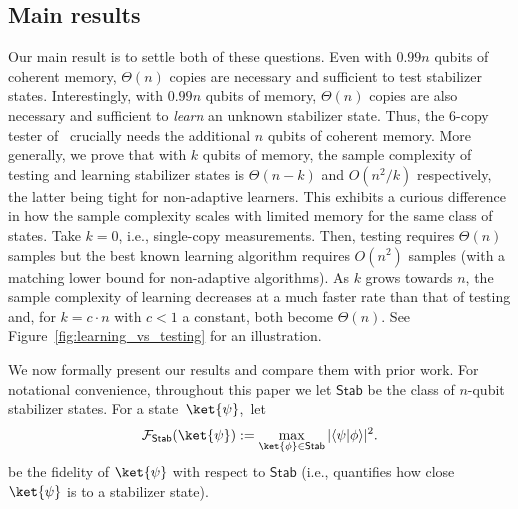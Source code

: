 \documentclass[11pt]{article}
\newcommand{\Sh}{\ensuremath{\textsf{Stab}}}
\begin{document}
\subsection{Main results}
Our main result is to settle both of these questions. Even with $0.99n$ qubits of coherent memory, $\Theta(n)$ copies are necessary and sufficient to test stabilizer states. Interestingly, with $0.99n$ qubits of memory, $\Theta(n)$ copies are also necessary and sufficient to \emph{learn} an unknown stabilizer state. Thus, the $6$-copy tester of~\cite{gross2021schur} crucially needs the additional $n$ qubits of coherent memory. More generally, we prove that with $k$ qubits of memory, the sample complexity of testing and learning stabilizer states is $\Theta(n-k)$ and $O(n^2/k)$ respectively, the latter being tight for non-adaptive learners. This exhibits a curious difference in how the sample complexity scales with limited memory for the same class of states. Take $k=0$, i.e., single-copy measurements. Then, testing requires $\Theta(n)$ samples but the best known learning algorithm requires $O(n^2)$ samples (with a matching lower bound for non-adaptive algorithms). As $k$ grows towards $n$, the sample complexity of learning decreases at a much faster rate than that of testing and, for $k = c\cdot n $ with $c<1$ a constant, both become $\Theta(n)$. See Figure~\ref{fig:learning_vs_testing} for an illustration.



We now formally present our results and compare them with prior work. For notational convenience, throughout this paper we let $\Sh$ be the class of $n$-qubit stabilizer states. For a state~$\ket{\psi}$,~let
$$
\mathcal{F}_{\cal \Sh}(\ket{\psi}):=\max_{\ket{\phi}\in \Sh}|\langle \psi|\phi\rangle|^2.
$$
be the fidelity of $\ket{\psi}$ with respect to $\Sh$ (i.e., quantifies how close $\ket{\psi}$ is to a stabilizer state). 
\end{document}
